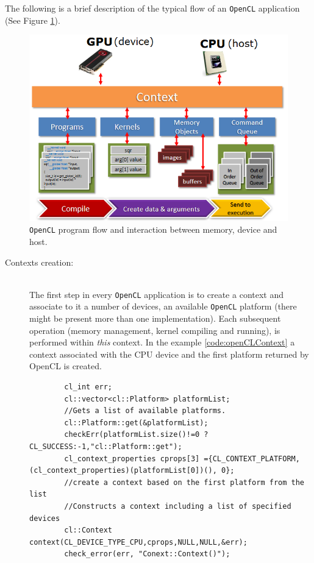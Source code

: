 \begin{description}
    The following is a brief description of the typical flow of an \texttt{OpenCL} application (See Figure \ref{fig:opencl_flow_model}).
    \begin{figure}
    	\centering
    	\includegraphics[width=1.0\textwidth]{./images/parallel_programming/opencl_program_flow}
    	\caption{\texttt{OpenCL} program flow and interaction between memory, device and host.}\label{fig:opencl_flow_model}
    \end{figure}

    \begin{description}
    	\item [Contexts creation:]\hfil \\ The first step in every \texttt{OpenCL} application is to create a context and associate to it a number of devices, an available \texttt{OpenCL} platform (there might be present more than one implementation). Each subsequent operation (memory management, kernel compiling and running), is performed within \emph{this} context. In the example \ref{code:openCLContext} a context associated with the CPU device and the first platform returned by OpenCL is created.
    	\begin{lstlisting}
    	cl_int err;
    	cl::vector<cl::Platform> platformList;
    	//Gets a list of available platforms.
    	cl::Platform::get(&platformList); 
   		checkErr(platformList.size()!=0 ?CL_SUCCESS:-1,"cl::Platform::get");
    	cl_context_properties cprops[3] ={CL_CONTEXT_PLATFORM,(cl_context_properties)(platformList[0])(), 0};
    	//create a context based on the first platform from the list
    	//Constructs a context including a list of specified devices
    	cl::Context context(CL_DEVICE_TYPE_CPU,cprops,NULL,NULL,&err);
    	check_error(err, "Conext::Context()"); 
    	\end{lstlisting}


\end{description}
\end{description}
